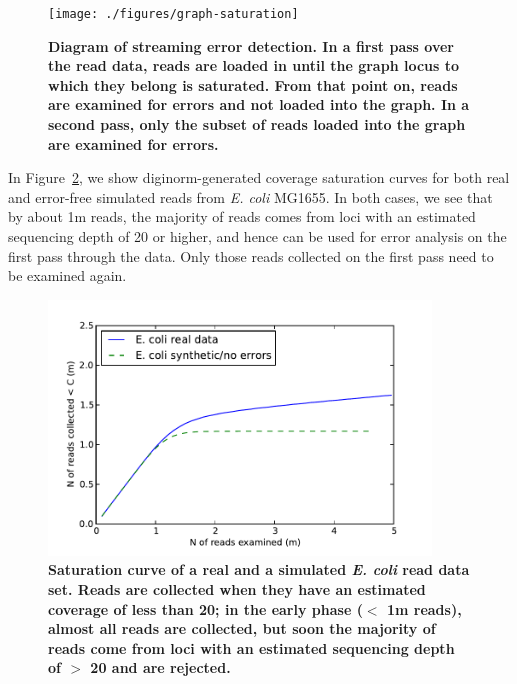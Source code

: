 \documentclass{article}
\begin{document}
\begin{figure}[!ht]
 \centerline{\texttt{[image: ./figures/graph-saturation]}}
\caption{\bf Diagram of streaming error detection. In a first pass
over the read data, reads are loaded in until the graph locus to which
they belong is saturated.  From that point on, reads are examined for
errors and not loaded into the graph.  In a second pass, only the subset
of reads loaded into the graph are examined for errors.}
\label{fig:concept}
\end{figure}

In Figure~\ref{fig:saturation}, we show diginorm-generated coverage
saturation curves for both real and error-free simulated reads from
{\em E. coli} MG1655.  In both cases, we see that by about 1m reads,
the majority of reads comes from loci with an estimated sequencing
depth of 20 or higher, and hence can be used for error analysis on the
first pass through the data.  Only those reads collected on the first
pass need to be examined again.

\begin{figure}[!ht]
 \centerline{\includegraphics[width=4in]{./figures/saturation}}
\caption{\bf Saturation curve of a real and a simulated {\em E. coli} read data
set.  Reads are collected when they have an estimated coverage of less
than 20; in the early phase ($<$ 1m reads), almost all reads are
collected, but soon the majority of reads come from loci with an estimated
sequencing depth of $>$ 20 and are rejected.}
\label{fig:saturation}
\end{figure}

\end{document}
